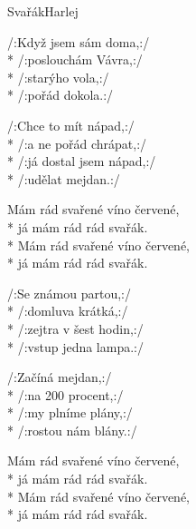 \documentclass[10.5pt]{book}
\begin{document}
\begin{poem}{Svařák}{Harlej}

\settowidth{\versewidth}{svůj hrob, a že stloukám si kříž.}

/:Když jsem sám doma,:/\\*
/:poslouchám Vávra,:/\\*
/:starýho vola,:/\\*
/:pořád dokola.:/

/:Chce to mít nápad,:/\\*
/:a ne pořád chrápat,:/\\*
/:já dostal jsem nápad,:/\\*
/:udělat mejdan.:/

Mám rád svařené víno červené,\\*
já mám rád rád svařák.\\*
Mám rád svařené víno červené,\\*
já mám rád rád svařák.

/:Se známou partou,:/\\*
/:domluva krátká,:/\\*
/:zejtra v šest hodin,:/\\*
/:vstup jedna lampa.:/

/:Začíná mejdan,:/\\*
/:na 200 procent,:/\\*
/:my plníme plány,:/\\*
/:rostou nám blány.:/

Mám rád svařené víno červené,\\*
já mám rád rád svařák.\\*
Mám rád svařené víno červené,\\*
já mám rád rád svařák.

\end{poem}
\end{document}
